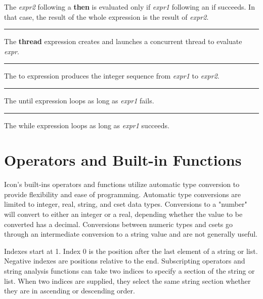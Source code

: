 \noindent
{}The \textit{expr2} following a \textsf{\bf then} is evaluated
only if \textit{expr1} following an \textsf{if} succeeds. In that case,
the result of the whole expression is the result of \textit{expr2}.


\bigskip\hrule\vspace{0.1cm}

\noindent
{}The \textsf{\bf thread} expression creates and launches
a concurrent thread to evaluate \textit{expr}.

\bigskip\hrule\vspace{0.1cm}

\noindent
{}The \textsf{to} expression produces the integer
sequence from \textit{expr1} to \textit{expr2}.

\bigskip\hrule\vspace{0.1cm}

\noindent
{}The \textsf{until} expression loops as long
as \textit{expr1} fails.

\bigskip\hrule\vspace{0.1cm}

\noindent
{}The \textsf{while} expression loops as long as
\textit{expr1} succeeds.

\section{Operators and Built-in Functions}

Icon's built-ins operators and functions utilize
automatic type conversion to provide flexibility and ease of
programming. Automatic type
conversions are limited to
integer, real, string, and cset data types. Conversions to a "number" will
convert to either an integer or a real, depending whether the value to
be converted has a decimal. Conversions between numeric types and csets
go through an intermediate conversion to a string value and are not
generally useful.

Indexes start at 1. Index 0 is the position after the last element of a
string or list. Negative indexes are positions
relative to the end. Subscripting operators and string analysis
functions can take two indices to specify a section of the string or
list. When two indices are supplied, they select the same string
section whether they are in ascending or descending order.

